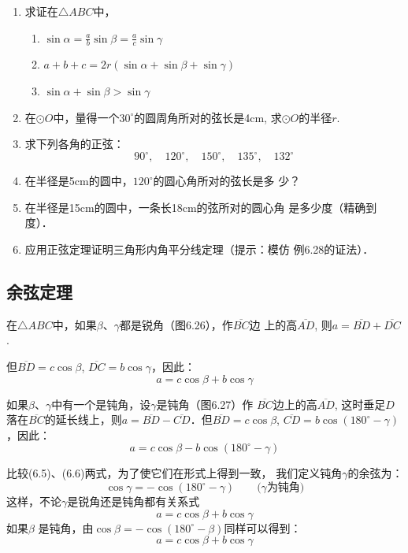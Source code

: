 \begin{ex}
\begin{enumerate}
    \item 求证在$\triangle ABC$中，
\begin{enumerate}
    \item $\sin\alpha=\frac{a}{b}\sin\beta=\frac{a}{c}\sin\gamma$
    \item $a+b+c=2r(\sin\alpha +\sin\beta+\sin\gamma)$
    \item $\sin\alpha+\sin\beta>\sin\gamma$
\end{enumerate}

\item 在$\odot O$中，量得一个$30^{\circ}$的圆周角所对的弦长是4cm,
求$\odot O$的半径$r$.
\item 求下列各角的正弦：
\[90^{\circ},\quad 120^{\circ},\quad 150^{\circ},\quad 135^{\circ},\quad 132^{\circ}\]
\item 在半径是5cm的圆中，$120^{\circ}$的圆心角所对的弦长是多
少？
\item 在半径是15cm的圆中，一条长18cm的弦所对的圆心角
是多少度（精确到度）．
\item 应用正弦定理证明三角形内角平分线定理（提示：模仿
例6.28的证法）．
\end{enumerate}
\end{ex}

\subsection{余弦定理}
在$\triangle ABC$中，如果$\beta$、$\gamma$都是锐角（图6.26），作$\overline{BC}$边
上的高$\overline{AD}$, 则$a=\overline{BD}+\overline{DC}$.

但$\overline{BD}=c\cos\beta$, $\overline{DC}=b\cos\gamma$，因此：
\begin{equation}
    a=c\cos\beta+b\cos\gamma
\end{equation}

如果$\beta$、$\gamma$中有一个是钝角，设$\gamma$是钝角（图6.27）作
$\overline{BC}$边上的高$\overline{AD}$, 这时垂足$D$落在$\overline{BC}$的延长线上，则$a=\overline{BD}-\overline{CD}$．但$\overline{BD}=c\cos\beta$, $\overline{CD}=b\cos(180^{\circ}-\gamma)$，因此：
\begin{equation}
    a=c\cos\beta -b\cos(180^{\circ}-\gamma)
\end{equation}

比较(6.5)、(6.6)两式，为了使它们在形式上得到一致，
我们定义钝角$\gamma$的余弦为：
\[\cos\gamma=-\cos(180^{\circ}-\gamma)\qquad \text{($\gamma$为钝角)}\]
这样，不论$\gamma$是锐角还是钝角都有关系式
\[a=c\cos\beta +b\cos\gamma\]
如果$\beta$ 是钝角，由$\cos\beta =-\cos(180^{\circ}-\beta )$同样可以得到：
\[a=c\cos\beta +b\cos\gamma\]

